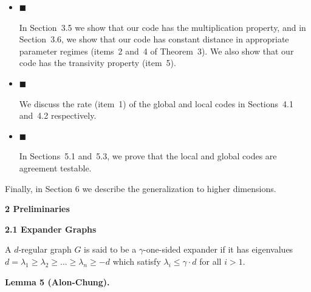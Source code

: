 \begin{itemize}


\item[] 
$\blacksquare$ 


In Section 3.5 we show that our code has the multiplication property, and in Section 3.6, we show that our code has constant distance in appropriate parameter regimes (items 2 and 4 of Theorem 3). We also show that our code has the transivity property (item 5).\par





\item[] 
$\blacksquare$ 


We discuss the rate (item 1) of the global and local codes in Sections 4.1 and 4.2 respectively.\par





\item[] 
$\blacksquare$ 


In Sections 5.1 and 5.3, we prove that the local and global codes are agreement testable.\par





\end{itemize}


Finally, in Section 6 we describe the generalization to higher dimensions.\par






\par\medskip\noindent\textbf{
2 Preliminaries}\par




\par\medskip\noindent\textbf{
2.1 Expander Graphs}\par




A $d$-regular graph $G$ is said to be a $\gamma$-one-sided expander if it has eigenvalues $d=\lambda_{1}\geq\lambda_{2}\geq...\geq\lambda_{n}\geq-d$ which satisfy $\lambda_{i}\leq\gamma\cdot d$ for all $i>1$.\par





\par\medskip\noindent\textbf{
\textbf{Lemma 5}\textbf{ }(Alon-Chung)\textbf{.}
}\par



